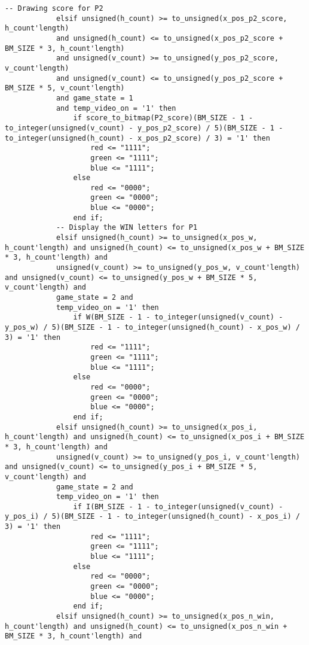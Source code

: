 \documentclass{article}
\begin{document}
\begin{lstlisting}[caption=Draw Process, label=lst:draw-process]
            -- Drawing score for P2
            elsif unsigned(h_count) >= to_unsigned(x_pos_p2_score, h_count'length)
            and unsigned(h_count) <= to_unsigned(x_pos_p2_score + BM_SIZE * 3, h_count'length)
            and unsigned(v_count) >= to_unsigned(y_pos_p2_score, v_count'length)
            and unsigned(v_count) <= to_unsigned(y_pos_p2_score + BM_SIZE * 5, v_count'length)
            and game_state = 1
            and temp_video_on = '1' then
                if score_to_bitmap(P2_score)(BM_SIZE - 1 - to_integer(unsigned(v_count) - y_pos_p2_score) / 5)(BM_SIZE - 1 - to_integer(unsigned(h_count) - x_pos_p2_score) / 3) = '1' then
                    red <= "1111";
                    green <= "1111";
                    blue <= "1111";
                else
                    red <= "0000";
                    green <= "0000";
                    blue <= "0000";
                end if;
            -- Display the WIN letters for P1
            elsif unsigned(h_count) >= to_unsigned(x_pos_w, h_count'length) and unsigned(h_count) <= to_unsigned(x_pos_w + BM_SIZE * 3, h_count'length) and
            unsigned(v_count) >= to_unsigned(y_pos_w, v_count'length) and unsigned(v_count) <= to_unsigned(y_pos_w + BM_SIZE * 5, v_count'length) and
            game_state = 2 and
            temp_video_on = '1' then
                if W(BM_SIZE - 1 - to_integer(unsigned(v_count) - y_pos_w) / 5)(BM_SIZE - 1 - to_integer(unsigned(h_count) - x_pos_w) / 3) = '1' then
                    red <= "1111";
                    green <= "1111";
                    blue <= "1111";
                else
                    red <= "0000";
                    green <= "0000";
                    blue <= "0000";
                end if;
            elsif unsigned(h_count) >= to_unsigned(x_pos_i, h_count'length) and unsigned(h_count) <= to_unsigned(x_pos_i + BM_SIZE * 3, h_count'length) and
            unsigned(v_count) >= to_unsigned(y_pos_i, v_count'length) and unsigned(v_count) <= to_unsigned(y_pos_i + BM_SIZE * 5, v_count'length) and
            game_state = 2 and
            temp_video_on = '1' then
                if I(BM_SIZE - 1 - to_integer(unsigned(v_count) - y_pos_i) / 5)(BM_SIZE - 1 - to_integer(unsigned(h_count) - x_pos_i) / 3) = '1' then
                    red <= "1111";
                    green <= "1111";
                    blue <= "1111";
                else
                    red <= "0000";
                    green <= "0000";
                    blue <= "0000";
                end if;
            elsif unsigned(h_count) >= to_unsigned(x_pos_n_win, h_count'length) and unsigned(h_count) <= to_unsigned(x_pos_n_win + BM_SIZE * 3, h_count'length) and

\end{lstlisting}
\end{document}
